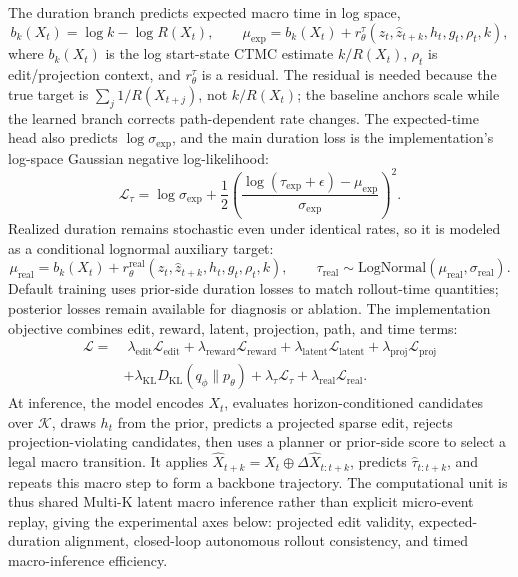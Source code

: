 \documentclass{article}
\begin{document}
\noindent The duration branch predicts expected macro time in log space,
\begin{equation}
b_k(X_t)=\log k-\log R(X_t), \qquad
\mu_{\mathrm{exp}}=b_k(X_t)+r^\tau_\theta(z_t,\hat{z}_{t+k},h_t,g_t,\rho_t,k),
\end{equation}
where $b_k(X_t)$ is the log start-state CTMC estimate $k/R(X_t)$, $\rho_t$ is edit/projection context, and $r^\tau_\theta$ is a residual. The residual is needed because the true target is $\sum_j 1/R(X_{t+j})$, not $k/R(X_t)$; the baseline anchors scale while the learned branch corrects path-dependent rate changes. The expected-time head also predicts $\log\sigma_{\mathrm{exp}}$, and the main duration loss is the implementation's log-space Gaussian negative log-likelihood:
\begin{equation}
\mathcal{L}_\tau
=
\log\sigma_{\mathrm{exp}}
+\frac{1}{2}
\left(
\frac{\log(\tau_{\mathrm{exp}}+\epsilon)-\mu_{\mathrm{exp}}}
{\sigma_{\mathrm{exp}}}
\right)^2 .
\end{equation}
Realized duration remains stochastic even under identical rates, so it is modeled as a conditional lognormal auxiliary target:
\begin{equation}
\mu_{\mathrm{real}}=b_k(X_t)+r^{\mathrm{real}}_\theta(z_t,\hat{z}_{t+k},h_t,g_t,\rho_t,k),\qquad
\tau_{\mathrm{real}}\sim \mathrm{LogNormal}(\mu_{\mathrm{real}},\sigma_{\mathrm{real}}).
\end{equation}
Default training uses prior-side duration losses to match rollout-time quantities; posterior losses remain available for diagnosis or ablation. The implementation objective combines edit, reward, latent, projection, path, and time terms:
\begin{equation}
\begin{aligned}
\mathcal{L}
=&\;
\lambda_{\mathrm{edit}}\mathcal{L}_{\mathrm{edit}}
+\lambda_{\mathrm{reward}}\mathcal{L}_{\mathrm{reward}}
+\lambda_{\mathrm{latent}}\mathcal{L}_{\mathrm{latent}}
+\lambda_{\mathrm{proj}}\mathcal{L}_{\mathrm{proj}}\\
&+\lambda_{\mathrm{KL}}D_{\mathrm{KL}}(q_\phi\parallel p_\theta)
+\lambda_{\tau}\mathcal{L}_{\tau}
+\lambda_{\mathrm{real}}\mathcal{L}_{\mathrm{real}} .
\end{aligned}
\end{equation}
At inference, the model encodes $X_t$, evaluates horizon-conditioned candidates over $\mathcal{K}$, draws $h_t$ from the prior, predicts a projected sparse edit, rejects projection-violating candidates, then uses a planner or prior-side score to select a legal macro transition. It applies $\hat{X}_{t+k}=X_t\oplus\Delta\hat{X}_{t:t+k}$, predicts $\hat{\tau}_{t:t+k}$, and repeats this macro step to form a backbone trajectory. The computational unit is thus shared Multi-K latent macro inference rather than explicit micro-event replay, giving the experimental axes below: projected edit validity, expected-duration alignment, closed-loop autonomous rollout consistency, and timed macro-inference efficiency.
\end{document}
